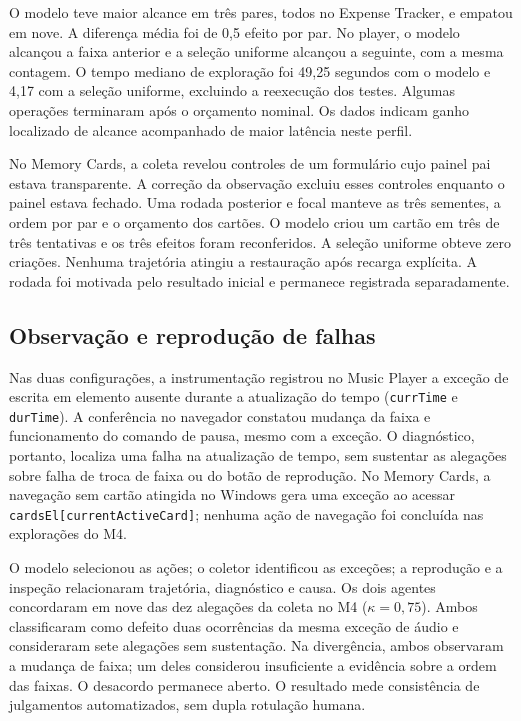 \documentclass[12pt]{article}
\begin{document}
O modelo teve maior alcance em três pares, todos no Expense Tracker, e empatou em nove. A diferença média foi de 0,5 efeito por par. No player, o modelo alcançou a faixa anterior e a seleção uniforme alcançou a seguinte, com a mesma contagem. O tempo mediano de exploração foi 49,25 segundos com o modelo e 4,17 com a seleção uniforme, excluindo a reexecução dos testes. Algumas operações terminaram após o orçamento nominal. Os dados indicam ganho localizado de alcance acompanhado de maior latência neste perfil.

No Memory Cards, a coleta revelou controles de um formulário cujo painel pai estava transparente. A correção da observação excluiu esses controles enquanto o painel estava fechado. Uma rodada posterior e focal manteve as três sementes, a ordem por par e o orçamento dos cartões. O modelo criou um cartão em três de três tentativas e os três efeitos foram reconferidos. A seleção uniforme obteve zero criações. Nenhuma trajetória atingiu a restauração após recarga explícita. A rodada foi motivada pelo resultado inicial e permanece registrada separadamente.

\subsection{Observação e reprodução de falhas}
Nas duas configurações, a instrumentação registrou no Music Player a exceção de escrita em elemento ausente durante a atualização do tempo (\texttt{currTime} e \texttt{durTime}). A conferência no navegador constatou mudança da faixa e funcionamento do comando de pausa, mesmo com a exceção. O diagnóstico, portanto, localiza uma falha na atualização de tempo, sem sustentar as alegações sobre falha de troca de faixa ou do botão de reprodução. No Memory Cards, a navegação sem cartão atingida no Windows gera uma exceção ao acessar \texttt{cardsEl[currentActiveCard]}; nenhuma ação de navegação foi concluída nas explorações do M4.

O modelo selecionou as ações; o coletor identificou as exceções; a reprodução e a inspeção relacionaram trajetória, diagnóstico e causa. Os dois agentes concordaram em nove das dez alegações da coleta no M4 (\(\kappa=0{,}75\)). Ambos classificaram como defeito duas ocorrências da mesma exceção de áudio e consideraram sete alegações sem sustentação. Na divergência, ambos observaram a mudança de faixa; um deles considerou insuficiente a evidência sobre a ordem das faixas. O desacordo permanece aberto. O resultado mede consistência de julgamentos automatizados, sem dupla rotulação humana.
\end{document}

